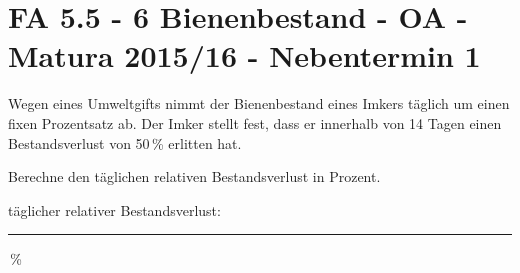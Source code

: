 \section{FA 5.5 - 6 Bienenbestand - OA - Matura 2015/16 - Nebentermin 1}

\begin{beispiel}[FA 5.5]{1} %
Wegen eines Umweltgifts nimmt der Bienenbestand eines Imkers täglich um einen fixen Prozentsatz
ab. Der Imker stellt fest, dass er innerhalb von 14 Tagen einen Bestandsverlust von 50\,\%
erlitten hat.\leer

Berechne den täglichen relativen Bestandsverlust in Prozent. \leer

täglicher relativer Bestandsverlust:\rule{4cm}{0.3pt}\,\%

\end{beispiel}